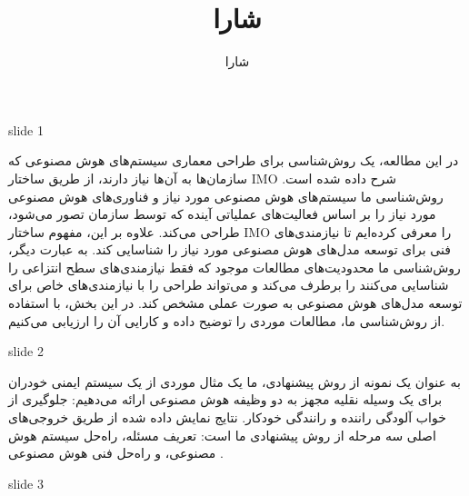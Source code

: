 \documentclass[a4paper,10pt]{article}
\title{شارا}
\author{شارا}
\date{}
\begin{document}
    \maketitle

    slide 1 

    در این مطالعه، یک روش‌شناسی برای طراحی معماری سیستم‌های هوش مصنوعی که سازمان‌ها به آن‌ها نیاز دارند، از طریق ساختار IMO شرح داده شده است. روش‌شناسی ما سیستم‌های هوش مصنوعی مورد نیاز و فناوری‌های هوش مصنوعی مورد نیاز را بر اساس فعالیت‌های عملیاتی آینده که توسط سازمان تصور می‌شود، طراحی می‌کند. علاوه بر این، مفهوم ساختار IMO را معرفی کرده‌ایم تا نیازمندی‌های فنی برای توسعه مدل‌های هوش مصنوعی مورد نیاز را شناسایی کند. به عبارت دیگر، روش‌شناسی ما محدودیت‌های مطالعات موجود که فقط نیازمندی‌های سطح انتزاعی را شناسایی می‌کنند را برطرف می‌کند و می‌تواند طراحی را با نیازمندی‌های خاص برای توسعه مدل‌های هوش مصنوعی به صورت عملی مشخص کند. در این بخش، با استفاده از روش‌شناسی ما، مطالعات موردی را توضیح داده و کارایی آن را ارزیابی می‌کنیم.

    slide 2

    به عنوان یک نمونه از روش پیشنهادی، ما یک مثال موردی از یک سیستم ایمنی خودران برای یک وسیله نقلیه مجهز به دو وظیفه هوش مصنوعی ارائه می‌دهیم: جلوگیری از خواب آلودگی راننده و رانندگی خودکار. نتایج نمایش داده شده از طریق خروجی‌های اصلی سه مرحله از روش پیشنهادی ما است: تعریف مسئله، راه‌حل سیستم هوش مصنوعی، و راه‌حل فنی هوش مصنوعی .

    slide 3
    
\end{document}

